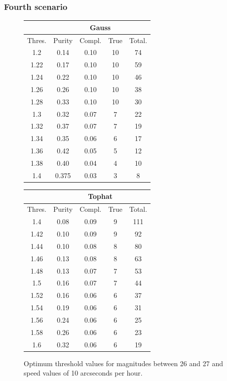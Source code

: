 \documentclass{article}
\begin{document}
\subsubsection{Fourth scenario}
\begin{figure}[H]
\centering
\begin{tabular}{|c|c|c|c|c|}
\hline
\multicolumn{1}{|c|}{} & \multicolumn{4}{c|}{Gauss} \\
\hline \hline
Thres. & Purity & Compl. & True & Total.\\
\hline
1.2 & 0.14 & 0.10 & 10 & 74\\
\hline
1.22 & 0.17 & 0.10 & 10 & 59\\
\hline
1.24 & 0.22 & 0.10 & 10 & 46\\
\hline
1.26 & 0.26 & 0.10 & 10 & 38\\
\hline
1.28 & 0.33 & 0.10 & 10 & 30\\
\hline
1.3 & 0.32 & 0.07 & 7 & 22\\
\hline
1.32 & 0.37 & 0.07 & 7 & 19\\
\hline
1.34 & 0.35 & 0.06 & 6 & 17\\
\hline
1.36 & 0.42 & 0.05 & 5 & 12\\
\hline
1.38 & 0.40 & 0.04 & 4 & 10\\
\hline
1.4 & 0.375 & 0.03 & 3 & 8\\
\hline
\end{tabular}
\qquad
\begin{tabular}{|c|c|c|c|c|}
\hline
\multicolumn{1}{|c|}{} & \multicolumn{4}{c|}{Tophat} \\
\hline \hline
Thres. & Purity & Compl. & True & Total.\\
\hline
1.4 & 0.08 & 0.09 & 9 & 111\\
\hline
1.42 & 0.10 & 0.09 & 9 & 92\\
\hline
1.44 & 0.10 & 0.08 & 8 & 80\\
\hline
1.46 & 0.13 & 0.08 & 8 & 63\\
\hline
1.48 & 0.13 & 0.07 & 7 & 53\\
\hline
1.5 & 0.16 & 0.07 & 7 & 44\\
\hline
1.52 & 0.16 & 0.06 & 6 & 37\\
\hline
1.54 & 0.19 & 0.06 & 6 & 31\\
\hline
1.56 & 0.24 & 0.06 & 6 & 25\\
\hline
1.58 & 0.26 & 0.06 & 6 & 23\\
\hline
1.6 & 0.32 & 0.06 & 6 & 19\\
\hline
\end{tabular}
\captionsetup{labelformat=andtable}
\caption{Optimum threshold values for magnitudes between 26 and 27 and speed values of 10 arcseconds per hour.}
\end{figure}
\end{document}
